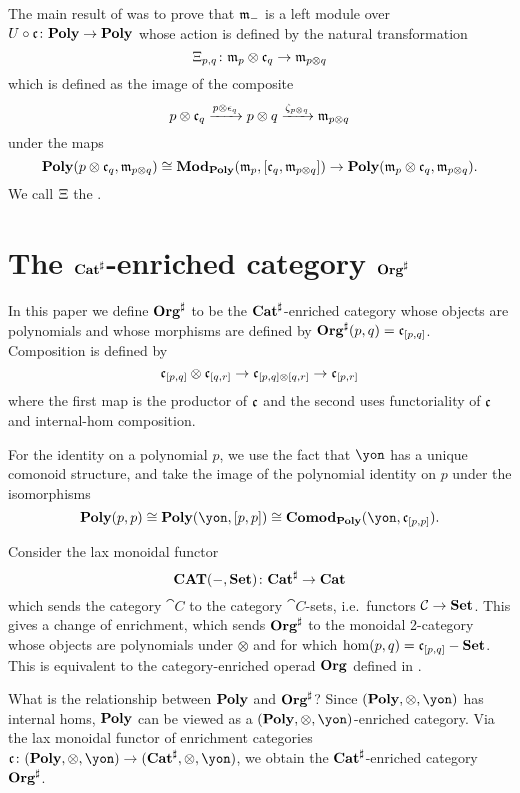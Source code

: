 The main result of \cite[Theorem 3.4]{libkind2024pattern} was to prove that $\mathfrak{m}_-$ is a left module over $U \circ  \mathfrak{c} \colon \mathbf{Poly} \to \mathbf{Poly}$ whose action is defined by the natural transformation 
\[
    \Xi_{p,q}\colon \mathfrak{m}_p \otimes \mathfrak{c}_q \to \mathfrak{m}_{p \otimes q}
\] which is defined as the image of the composite
\[
    p \otimes \mathfrak{c}_q \xrightarrow{p \otimes \epsilon_q} p \otimes q \xrightarrow{\zeta_{p \otimes q}} \mathfrak{m}_{p \otimes q}
\] under the maps
\[
    \mathbf{Poly}(p \otimes \mathfrak{c}_q, \mathfrak{m}_{p\otimes q})  \cong \mathbf{Mod}_{\mathbf{Poly}}(\mathfrak{m}_p, [\mathfrak{c}_q, \mathfrak{m}_{p\otimes q}]) \to \mathbf{Poly}(\mathfrak{m}_p \otimes \mathfrak{c}_q, \mathfrak{m}_{p \otimes q}).
\] We call $\Xi$ the .



\section{The $\mathbf{Cat}^\sharp$-enriched category $\mathbf{Org}^\sharp$}\label{sec.orgsharp}

In this paper we define $\mathbf{Org}^\sharp$ to be the $\mathbf{Cat}^\sharp$-enriched category whose objects are polynomials and whose morphisms are defined by $\mathbf{Org}^\sharp(p, q) = \mathfrak{c}_{[p,q]}$. 
Composition is defined by 
\[
    \mathfrak{c}_{[p,q]} \otimes \mathfrak{c}_{[q,r]} \to \mathfrak{c}_{[p, q] \otimes [q, r]} \to \mathfrak{c}_{[p, r]}
\]
where the first map is the productor of $\mathfrak{c}$ and the second uses functoriality of $\mathfrak{c}$ and internal-hom composition.

For the identity on a polynomial $p$, we use the fact that $\yon$ has a unique comonoid structure, and take the image of the polynomial identity on $p$ under the isomorphisms
\[
    \poly(p, p) \iso \poly(\yon , [p, p]) \iso \comodpoly(\yon, \cofree_{[p,p]}).
\]

Consider the lax monoidal functor
\[\mathbf{CAT}(-,\mathbf{Set}) \colon \mathbf{Cat}^\sharp \to \mathbf{Cat}\]
which sends the category $\cat{C}$ to the category $\cat{C}$-sets, i.e.\ functors $\mathcal{C}\to\mathbf{Set}$. This gives a change of enrichment, which sends $\mathbf{Org}^\sharp$ to the monoidal 2-category whose objects are polynomials under $\otimes$ and for which $\hom(p,q)=\mathfrak{c}_{[p,q]}-\mathbf{Set}$. This is equivalent to the category-enriched operad $\mathbf{Org}$ defined in \cite[Definition 2.19]{spivak2021learnersv1}.

\begin{remark}
    What is the relationship between $\mathbf{Poly}$ and $\mathbf{Org}^\sharp$? Since $(\poly, \otimes, \yon)$ has internal homs, $\mathbf{Poly}$ can be viewed as a $(\poly, \otimes, \yon)$-enriched category. Via the lax monoidal functor of enrichment categories $\cofree\colon (\poly, \otimes, \yon) \to (\smcat^\sharp, \otimes, \yon)$, we obtain the $\mathbf{Cat}^\sharp$-enriched category $\mathbf{Org}^\sharp$.
\end{remark}

